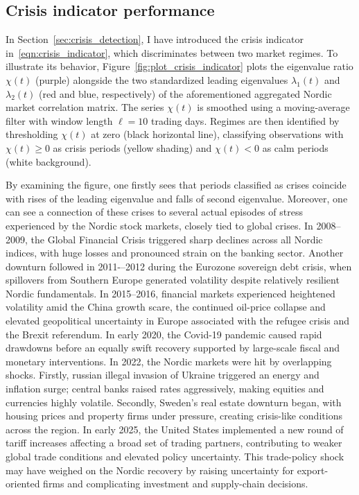\documentclass[pdflatex,sn-basic]{sn-jnl}%
\theoremstyle{thmstyleone}%
\theoremstyle{thmstyletwo}%
\theoremstyle{thmstylethree}%
\begin{document}
\subsection{Crisis indicator performance}
In Section~\ref{sec:crisis_detection}, I have introduced the crisis indicator in~\eqref{eqn:crisis_indicator}, which discriminates between two market regimes. To illustrate its behavior, Figure~\ref{fig:plot_crisis_indicator} plots the eigenvalue ratio $\chi(t)$ (purple) alongside the two standardized leading eigenvalues $\lambda_1(t)$ and $\lambda_2(t)$ (red and blue, respectively) of the aforementioned aggregated Nordic market correlation matrix. The series $\chi(t)$ is smoothed using a moving-average filter with window length $\ell=10$ trading days. Regimes are then identified by thresholding $\chi(t)$ at zero (black horizontal line), classifying observations with $\chi(t)\ge 0$ as crisis periods (yellow shading) and $\chi(t)<0$ as calm periods (white background).

By examining the figure, one firstly sees that periods classified as crises coincide with rises of the leading eigenvalue and falls of second eigenvalue. Moreover, one can see a connection of these crises to several actual episodes of stress experienced by the Nordic stock markets, closely tied to global crises. In 2008--2009, the Global Financial Crisis triggered sharp declines across all Nordic indices, with huge losses and pronounced strain on the banking sector. Another downturn followed in 2011-–2012 during the Eurozone sovereign debt crisis, when spillovers from Southern Europe generated volatility despite relatively resilient Nordic fundamentals. In 2015--2016, financial markets experienced heightened volatility amid the China growth scare, the continued oil-price collapse and elevated geopolitical uncertainty in Europe associated with the refugee crisis and the Brexit referendum. In early 2020, the Covid-19 pandemic caused rapid drawdowns before an equally swift recovery supported by large-scale fiscal and monetary interventions. In 2022, the Nordic markets were hit by overlapping shocks. Firstly, russian illegal invasion of Ukraine triggered an energy and inflation surge; central banks raised rates aggressively, making equities and currencies highly volatile. Secondly, Sweden’s real estate downturn began, with housing prices and property firms under pressure, creating crisis-like conditions across the region. In early 2025, the United States implemented a new round of tariff increases affecting a broad set of trading partners, contributing to weaker global trade conditions and elevated policy uncertainty. This trade-policy shock may have weighed on the Nordic recovery by raising uncertainty for export-oriented firms and complicating investment and supply-chain decisions.
\end{document}
